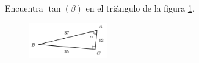 Encuentra $\tan(\beta)$ en el triángulo de la figura \ref{fig:functrig17}.
\begin{figure}[H]
    \begin{center}
        \includegraphics[width=0.3\textwidth]{../images/functrig17.png}
    \end{center}
    \caption{}
    \label{fig:functrig17}
\end{figure}
